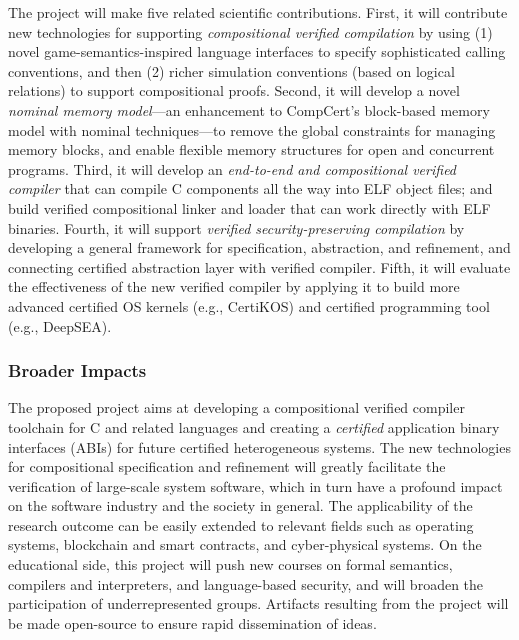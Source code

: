 The project will make five related scientific
contributions. First, it will contribute new technologies for supporting
{\em compositional verified compilation} by using (1) novel
game-semantics-inspired language interfaces to specify sophisticated
calling conventions, and then (2) richer simulation conventions (based
on logical relations) to support compositional proofs.  Second, it
will develop a novel {\em nominal memory model}---an enhancement to
CompCert's block-based memory model with nominal techniques---to
remove the global constraints for managing memory blocks, and enable
flexible memory structures for open and concurrent programs. Third, it
will develop an {\em end-to-end and compositional verified compiler}
that can compile C components all the way into ELF object files; and
build verified compositional linker and loader that can work directly
with ELF binaries.  Fourth, it will support {\em verified
security-preserving compilation} by developing a general framework for
specification, abstraction, and refinement, and connecting certified
abstraction layer with verified compiler. Fifth, it will evaluate the
effectiveness of the new verified compiler by applying it to build
more advanced certified OS kernels (e.g., CertiKOS) and certified
programming tool (e.g., DeepSEA).

\subsubsection*{Broader Impacts}

The proposed project aims at developing a compositional verified
compiler toolchain for C and related languages and creating a {\em
certified} application binary interfaces (ABIs) for future certified
heterogeneous systems. The new technologies for compositional
specification and refinement will greatly facilitate the verification
of large-scale system software, which in turn have a profound impact
on the software industry and the society in general. The applicability
of the research outcome can be easily extended to relevant fields such
as operating systems, blockchain and smart contracts, and
cyber-physical systems.  On the educational side, this project will
push new courses on formal semantics, compilers and interpreters, and
language-based security, and will broaden the participation of
underrepresented groups.  Artifacts resulting from the project will be
made open-source to ensure rapid dissemination of ideas.

